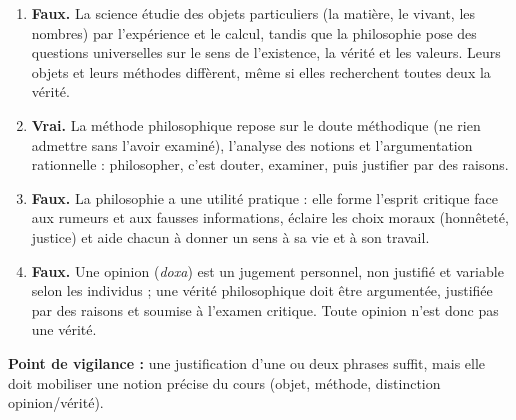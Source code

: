 \documentclass[11pt]{article}
\begin{document}
\begin{corrige}
\begin{enumerate}
\item \textbf{Faux.} La science étudie des objets particuliers (la matière, le vivant, les nombres) par l'expérience et le calcul, tandis que la philosophie pose des questions universelles sur le sens de l'existence, la vérité et les valeurs. Leurs objets et leurs méthodes diffèrent, même si elles recherchent toutes deux la vérité.
\item \textbf{Vrai.} La méthode philosophique repose sur le doute méthodique (ne rien admettre sans l'avoir examiné), l'analyse des notions et l'argumentation rationnelle : philosopher, c'est douter, examiner, puis justifier par des raisons.
\item \textbf{Faux.} La philosophie a une utilité pratique : elle forme l'esprit critique face aux rumeurs et aux fausses informations, éclaire les choix moraux (honnêteté, justice) et aide chacun à donner un sens à sa vie et à son travail.
\item \textbf{Faux.} Une opinion (\emph{doxa}) est un jugement personnel, non justifié et variable selon les individus ; une vérité philosophique doit être argumentée, justifiée par des raisons et soumise à l'examen critique. Toute opinion n'est donc pas une vérité.
\end{enumerate}
\textbf{Point de vigilance :} une justification d'une ou deux phrases suffit, mais elle doit mobiliser une notion précise du cours (objet, méthode, distinction opinion/vérité).
\end{corrige}
\end{document}
